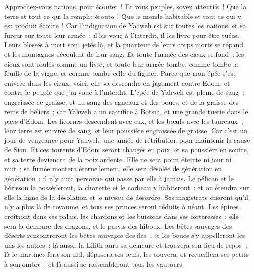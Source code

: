 \begin{multicols}{2}
\VerseOne{}Approchez-vous nations, pour écouter~! Et vous peuples, soyez attentifs~! Que la terre et tout ce qui la remplit écoute~! Que le monde habitable et tout ce qui y est produit écoute~!
Car l'indignation de Yahweh est sur toutes les nations, et sa fureur sur toute leur armée~; il les voue à l'interdit, il les livre pour être tuées.
Leurs blessés à mort sont jetés là, et la puanteur de leurs corps morts se répand et les montagnes découlent de leur sang.
Et toute l'armée des cieux se fond~; les cieux sont roulés comme un livre, et toute leur armée tombe, comme tombe la feuille de la vigne, et comme tombe celle du figuier.
Parce que mon épée s'est enivrée dans les cieux, voici, elle va descendre en jugement contre Edom, et contre le peuple que j'ai voué à l'interdit.
L'épée de Yahweh est pleine de sang~; engraissée de graisse, et du sang des agneaux et des boucs, et de la graisse des reins de béliers~; car Yahweh a un sacrifice à Botsra, et une grande tuerie dans le pays d'Edom.
Les licornes descendent avec eux, et les bœufs avec les taureaux~; leur terre est enivrée de sang, et leur poussière engraissée de graisse.
Car c'est un jour de vengeance pour Yahweh, une année de rétribution pour maintenir la cause de Sion.
Et ces torrents d'Edom seront changés en poix, et sa poussière en soufre, et sa terre deviendra de la poix ardente.
Elle ne sera point éteinte ni jour ni nuit~; sa fumée montera éternellement, elle sera désolée de génération en génération~; il n'y aura personne qui passe par elle à jamais.
Le pélican et le hérisson la posséderont, la chouette et le corbeau y habiteront~; et on étendra sur elle la ligne de la désolation et le niveau de désordre.
Ses magistrats crieront qu'il n'y a plus là de royaume, et tous ses princes seront réduits à néant.
Les épines croîtront dans ses palais, les chardons et les buissons dans ses forteresses~; elle sera la demeure des dragons, et le parvis des hiboux.
Les bêtes sauvages des déserts rencontreront les bêtes sauvages des îles~; et les boucs s'y appelleront les uns les autres~; là aussi, la Lilith aura sa demeure et trouvera son lieu de repos~;
là le martinet fera son nid, déposera ses œufs, les couvera, et recueillera ses petits à son ombre~; et là aussi se rassembleront tous les vautours.

\end{multicols}
